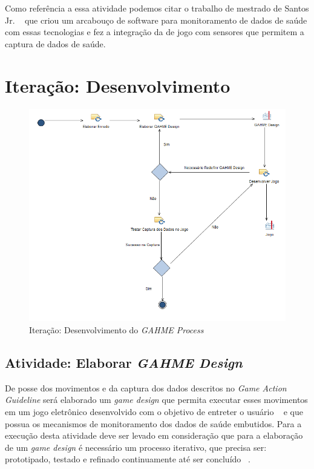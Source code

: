 Como referência a essa atividade podemos citar o trabalho de mestrado de Santos Jr. ~\cite{antonio2013} que criou um arcabouço de software para monitoramento de dados de saúde com essas tecnologias e fez a integração da  de jogo com sensores que permitem a captura de dados de saúde.

\section{Iteração: Desenvolvimento}
\begin{figure}
 \centering
 \includegraphics[scale=0.55]{./img/desenvolvimento.png}
\caption{Iteração: Desenvolvimento do \textit{GAHME Process}}
 \label{fig:desenvolvimento}
\end{figure}

\subsection{Atividade: Elaborar \textit{GAHME Design}}
De posse dos movimentos e da captura dos dados descritos no \textit{Game Action Guideline} será elaborado um \textit{game design} que permita executar esses movimentos em um jogo eletrônico desenvolvido com o objetivo de entreter o usuário ~\cite{sweetser2005-gameflow} e que possua os mecanismos de monitoramento dos dados de saúde embutidos. Para a execução desta atividade deve ser levado em consideração que para a elaboração de um \textit{game design} é necessário um processo iterativo, que precisa ser: prototipado, testado e refinado continuamente até ser concluído ~\cite{brathwaite2009challenges}.

